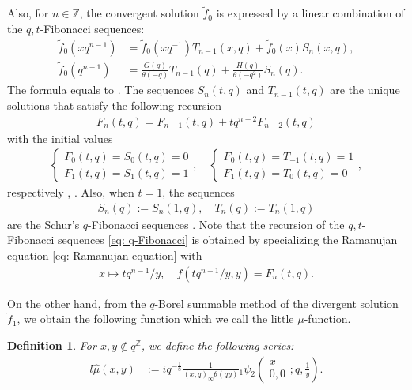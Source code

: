 \documentclass[a4paper]{article}
\newcommand{\Zz}{\mathbb{Z}}
\numberwithin{equation}{section}
\theoremstyle{plain}
\newtheorem{defi}{Definition}
\begin{document}
Also, for $n\in\Zz$, the convergent solution $\widetilde{f}_0$ is expressed by a linear combination of the $q,t$-Fibonacci sequences: 
\begin{align}
\widetilde{f}_0\left(xq^{n-1}\right)&=\widetilde{f}_0(xq^{-1})T_{n-1}(x,q)+\widetilde{f}_0(x)S_{n}(x,q)
, \\
\label{eq: Garret, Ismail formula}
\widetilde{f}_0(q^{n-1})&=\frac{G(q)}{\theta(-q)}T_{n-1}(q)+\frac{H(q)}{\theta(-q^2)}S_n(q). 
\end{align}
The formula equals to \cite[(3.2)]{GIS}. 
The sequences $S_n(t,q)$ and $T_{n-1}(t,q)$ are the unique solutions that satisfy the following recursion
\begin{align}
\label{eq: q-Fibonacci}
F_n(t,q)=F_{n-1}(t,q)+tq^{n-2}F_{n-2}(t,q)
\end{align}
with the initial values 
\begin{align*}
\begin{cases}
F_0(t,q)=S_0(t,q)=0\\
F_1(t,q)=S_1(t,q)=1
\end{cases}, \quad 
\begin{cases}
F_0(t,q)=T_{-1}(t,q)=1\\
F_1(t,q)=T_0(t,q)=0
\end{cases}, 
\end{align*}
respectively \cite{A}, \cite{C}. 
Also, when $t=1$, the sequences
\begin{align}
\label{eq: Schur Fibo}
S_n(q):=S_n(1,q),\quad T_n(q):=T_n(1,q)
\end{align}
are the Schur's $q$-Fibonacci sequences \cite{S}.
Note that the recursion of the $q,t$-Fibonacci sequences \eqref{eq: q-Fibonacci} is obtained by specializing the Ramanujan equation \eqref{eq: Ramanujan equation} with 
\begin{align}
\label{eq: corresponding between q-Fibonacci and Raman ujan eq}
x\mapsto tq^{n-1}/y,\quad f\left(tq^{n-1}/y,y\right)=F_n(t,q). 
\end{align} 

On the other hand, from the $q$-Borel summable method of the divergent solution $\widetilde{f}_1$, we obtain the following function which we call the little $\mu$-function. 
\begin{defi}
For $x, y\not\in q^{\mathbb{Z}} $, we define the following series: 
\begin{align*}
l\widehat{\mu}(x,y)
   &:=
   iq^{-\frac{1}{8}}\frac{1}{(x,q)_{\infty }\theta(qy)}
   {}_1\psi_2\left(\begin{matrix} x \\ 0,0 \end{matrix};q,\frac{1}{y}\right).
\end{align*}
\end{defi}
\end{document}
